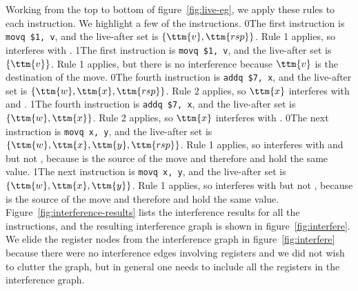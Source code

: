 \documentclass[7x10]{TimesAPriori_MIT}%
\def\racketEd{0}
\def\pythonEd{1}
\providecommand{\BookEdition}{1}
\let\edition\BookEdition
\newcommand{\racket}[1]{{\if\edition\racketEd{#1}\fi}}
\newcommand{\pythonColor}[0]{}
\newcommand{\python}[1]{{\if\edition\pythonEd\pythonColor #1\fi}}
\numberwithin{theorem}{chapter}
\numberwithin{definition}{chapter}
\numberwithin{equation}{chapter}
\begin{document}
Working from the top to bottom of figure~\ref{fig:live-eg}, we apply
these rules to each instruction. We highlight a few of the
instructions.  \racket{The first instruction is \lstinline{movq $1, v},
  and the live-after set is $\{\ttm{v},\ttm{rsp}\}$. Rule 1 applies,
  so \code{v} interferes with \code{rsp}.}
%
\python{The first instruction is \lstinline{movq $1, v}, and the
  live-after set is $\{\ttm{v}\}$. Rule 1 applies, but there is
  no interference because $\ttm{v}$ is the destination of the move.}
%
\racket{The fourth instruction is \lstinline{addq $7, x}, and the
  live-after set is $\{\ttm{w},\ttm{x},\ttm{rsp}\}$. Rule 2 applies, so
  $\ttm{x}$ interferes with  and \ttm{rsp}.}
%
\python{The fourth instruction is \lstinline{addq $7, x}, and the
  live-after set is $\{\ttm{w},\ttm{x}\}$. Rule 2 applies, so
  $$ interferes with .}
%
\racket{The next instruction is \lstinline{movq x, y}, and the
  live-after set is $\{\ttm{w},\ttm{x},\ttm{y},\ttm{rsp}\}$. Rule 1
  applies, so \ttm{y} interferes with \ttm{w} and \ttm{rsp} but not
  \ttm{x}, because \ttm{x} is the source of the move and therefore
   and  hold the same value.}
%
\python{The next instruction is \lstinline{movq x, y}, and the
  live-after set is $\{\ttm{w},\ttm{x},\ttm{y}\}$. Rule 1
  applies, so \ttm{y} interferes with \ttm{w} but not
  \ttm{x}, because \ttm{x} is the source of the move and therefore
  \ttm{x} and \ttm{y} hold the same value.}
%
Figure~\ref{fig:interference-results} lists the interference results
for all the instructions, and the resulting interference graph is
shown in figure~\ref{fig:interfere}. We elide the register nodes from
the interference graph in figure~\ref{fig:interfere} because there
were no interference edges involving registers and we did not wish to
clutter the graph, but in general one needs to include all the
registers in the interference graph.
\end{document}
